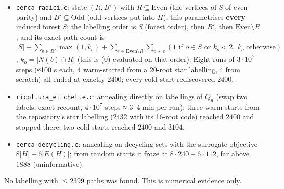 \begin{itemize}
\tightlist
\item
  \texttt{cerca\_radici.c}: state \((R,B')\) with
  \(R\subseteq\text{Even}\) (the vertices of \(S\) of even parity) and
  \(B'\subseteq\text{Odd}\) (odd vertices put into \(H\)); this
  parametrises \textbf{every} induced forest \(S\); the labelling order
  is \(S\) (forest order), then \(B'\), then \(\text{Even}\setminus R\),
  and its exact path count is
  \(|S|+\sum_{b\in B'}\max(1,k_b)+\sum_{e\in\text{Even}\setminus R}\sum_{o\sim e}(\text{1 if }o\in S\text{ or }k_o<2,\ k_o\text{ otherwise})\),
  \(k_b=|N(b)\cap R|\) (this is (0) evaluated on that order). Eight runs
  of \(3\cdot10^7\) steps (≈100 s each, 4 warm-started from a 20-root
  star labelling, 4 from scratch) all ended at exactly \(2400\); every
  cold start rediscovered \(2400\).
\item
  \texttt{ricottura\_etichette.c}: annealing directly on labellings of
  \(Q_9\) (swap two labels, exact recount, \(4\cdot10^7\) steps ≈ 3--4
  min per run): three warm starts from the repository's star labelling
  (2432 with its 16-root code) reached \(2400\) and stopped there; two
  cold starts reached \(2400\) and \(3104\).
\item
  \texttt{cerca\_decycling.c}: annealing on decycling sets with the
  surrogate objective \(8|H|+6|E(H)|\); from random starts it froze at
  \(8\cdot240+6\cdot112\), far above \(1888\) (uninformative).
\end{itemize}

No labelling with \(\le2399\) paths was found. This is numerical
evidence only.


